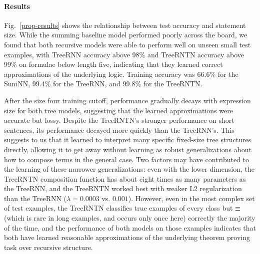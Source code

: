 \paragraph{Results} Fig.~\ref{prop-results} shows the relationship
between test accuracy and statement size. While the summing baseline model performed poorly across the board, we found that both recursive
models were able to perform well on unseen small test examples, 
with TreeRNN accuracy above
98\% and TreeRNTN accuracy above 99\% on formulae below length five, indicating
that they learned correct approximations of the underlying
logic. Training accuracy was 66.6\% for the SumNN, 99.4\% for the TreeRNN, and 99.8\% for the TreeRNTN.

After the size four training cutoff, performance gradually decays with expression size for both tree models, suggesting that the learned approximations were accurate but lossy.
Despite the TreeRNTN's stronger performance on short sentences, its performance
decayed more quickly than the TreeRNN's. 
This suggests to us that it learned to interpret many specific fixed-size tree structures directly,
allowing it to get away without learning as robust generalizations about how to compose
terms in the general case.
Two factors may have contributed to the learning of these narrower generalizations: 
even with the lower dimension,
the TreeRNTN composition function has about eight times as many parameters as the
TreeRNN, and the TreeRNTN worked best with weaker L2 regularization than the 
TreeRNN ($\lambda = 0.0003$ vs. $0.001$). 
However, even in the most complex set of test examples, the TreeRNTN classifies true examples of every
 class but $\equiv$ (which is rare in long examples, and occurs only once here) correctly 
the majority of the time, and
 the performance of both models on those examples indicates that both have learned
  reasonable approximations of the underlying theorem proving task over recursive structure.



